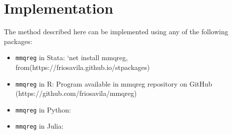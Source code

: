 \documentclass[
  authoryear,
  review,
  1p]{elsarticle}
\providecommand{\tightlist}{%
  \setlength{\itemsep}{0pt}\setlength{\parskip}{0pt}}\usepackage{longtable,booktabs,array}
\begin{document}
\hypertarget{implementation}{%
\section{Implementation}\label{implementation}}

The method described here can be implemented using any of the following
packages:

\begin{itemize}
\tightlist
\item
  \texttt{mmqreg} in Stata: `net install mmqreg,
  from(https://friosavila.github.io/stpackages)
\item
  \texttt{mmqreg} in R: Program available in mmqreg repository on GitHub
  (https://github.com/friosavila/mmqreg)
\item
  \texttt{mmqreg} in Python:
\item
  \texttt{mmqreg} in Julia:
\end{itemize}
\end{document}
